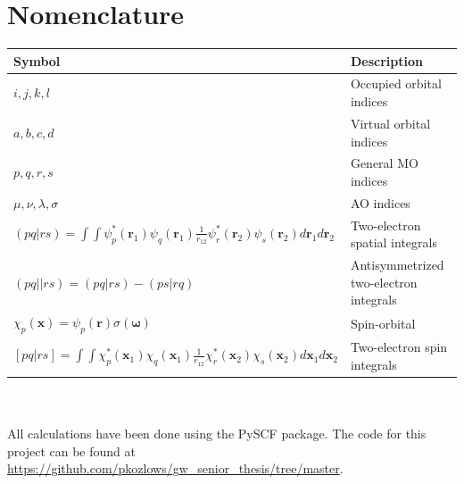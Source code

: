 \documentclass[12pt]{caltech_thesis}
\begin{document}
\chapter{Nomenclature}
\label{chap:nomenclature}
\begin{tabular}{p{} p{}}
Symbol & Description \\
\hline
\(i,j,k,l\) & Occupied orbital indices \\
\(a,b,c,d\) & Virtual orbital indices \\
\(p,q,r,s\) & General MO indices \\
\(\mu,\nu,\lambda,\sigma\) & AO indices \\
\((pq|rs) = \int \int \psi_p^*(\mathbf{r}_1)\psi_q(\mathbf{r}_1)\frac{1}{r_{12}}\psi_r^*(\mathbf{r}_2)\psi_s(\mathbf{r}_2)d\mathbf{r}_1d\mathbf{r}_2\) & Two-electron spatial integrals\\
\((pq||rs) = (pq|rs) - (ps|rq)\) & Antisymmetrized two-electron integrals \\
\(\chi _p (\mathbf{x}) = \psi _p (\mathbf{r})\sigma (\mathbf{\omega })\) & Spin-orbital \\
\([pq|rs] = \int \int \chi_p^*(\mathbf{x}_1)\chi_q(\mathbf{x}_1)\frac{1}{r_{12}}\chi_r^*(\mathbf{x}_2)\chi_s(\mathbf{x}_2)d\mathbf{x}_1d\mathbf{x}_2\) & Two-electron spin integrals \\

\end{tabular}\\\\
All calculations have been done using the PySCF package.\autocite{sun_recent_2020} The code for this project can be found at \url{https://github.com/pkozlows/gw_senior_thesis/tree/master}.
\end{document}
